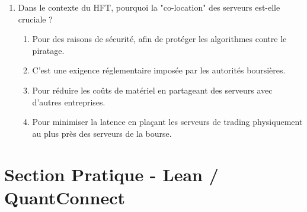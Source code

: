 \documentclass[a4paper,12pt]{article}
\begin{document}
\begin{enumerate}
    \item Dans le contexte du HFT, pourquoi la "co-location" des serveurs est-elle cruciale ?
    \begin{enumerate}[label=(\Alph*)]
        \item Pour des raisons de sécurité, afin de protéger les algorithmes contre le piratage.
        \item C'est une exigence réglementaire imposée par les autorités boursières.
        \item Pour réduire les coûts de matériel en partageant des serveurs avec d'autres entreprises.
        \item Pour minimiser la latence en plaçant les serveurs de trading physiquement au plus près des serveurs de la bourse.
    \end{enumerate}

\end{enumerate}

\newpage

\section*{Section Pratique - Lean / QuantConnect}
\end{document}
